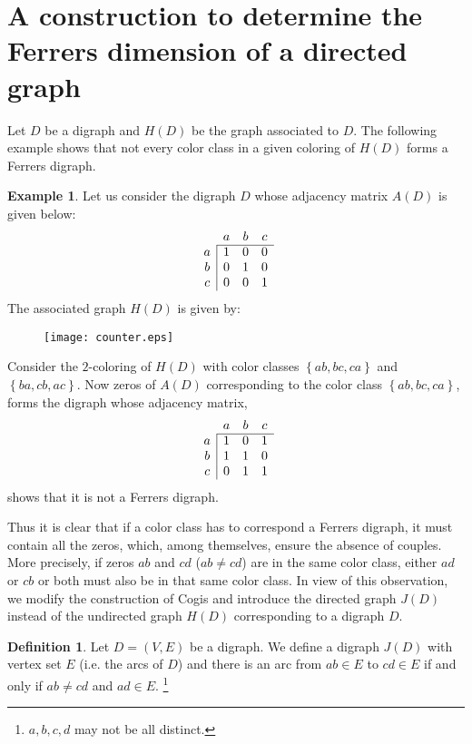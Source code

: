 \documentclass[11pt]{article}
\theoremstyle{definition}
\newtheorem{defn}[thm]{Definition}
\newtheorem{exmp}[thm]{Example}
\theoremstyle{remark}
\numberwithin{equation}{section}
\newcommand{\set}[1]{\left\{#1\right\}}
\begin{document}
\section{A construction to determine the Ferrers dimension of a directed graph}

Let $D$ be a digraph and $H(D)$ be the graph associated to $D$. The following example shows that not every color class in a given coloring of $H(D)$ forms a Ferrers digraph.

\begin{exmp}
Let us consider the digraph $D$ whose adjacency matrix $A(D)$ is given below:
$$\begin{array}{c|ccc}
\multicolumn{1}{c}{} & a & b & c \\ \cline{2-4}
a & 1 & 0 & 0 \\
b & 0 & 1 & 0 \\
c & 0 & 0 & 1
\end{array}$$
The associated graph $H(D)$ is given by:
\begin{figure}[h]
\begin{center}
\texttt{[image: counter.eps]}
\end{center}
\end{figure}

\noindent Consider the $2$-coloring of $H(D)$ with color classes $\set{ab,bc,ca}$ and $\set{ba,cb,ac}$. Now zeros of $A(D)$ corresponding to the color class $\set{ab,bc,ca}$,  forms the digraph whose adjacency matrix,
$$\begin{array}{c|ccc}
\multicolumn{1}{c}{} & a & b & c \\ \cline{2-4}
a & 1 & 0 & 1 \\
b & 1 & 1 & 0 \\
c & 0 & 1 & 1
\end{array}$$
shows that it is not a Ferrers digraph.
\end{exmp}

Thus it is clear that if a color class has to correspond a Ferrers digraph, it must contain all the zeros, which, among themselves, ensure the absence of couples. More precisely, if zeros $ab$ and $cd$ ($ab \neq cd$) are in the same color class, either $ad$ or $cb$ or both must also be in that same color class. In view of this observation, we modify the construction of Cogis and introduce the directed graph $J(D)$ instead of the undirected graph $H(D)$ corresponding to a digraph $D$.

\begin{defn}Let $D = (V, E)$ be a digraph. We define a digraph $J(D)$ with vertex set $E$ (i.e. the arcs of $D$) and there is an arc from $ab \in E$ to $cd \in E$ if and only if $ab \neq cd$ and $ad \in E$. \footnote{$a,b,c,d$ may not be all distinct.}
\end{defn}
\end{document}
